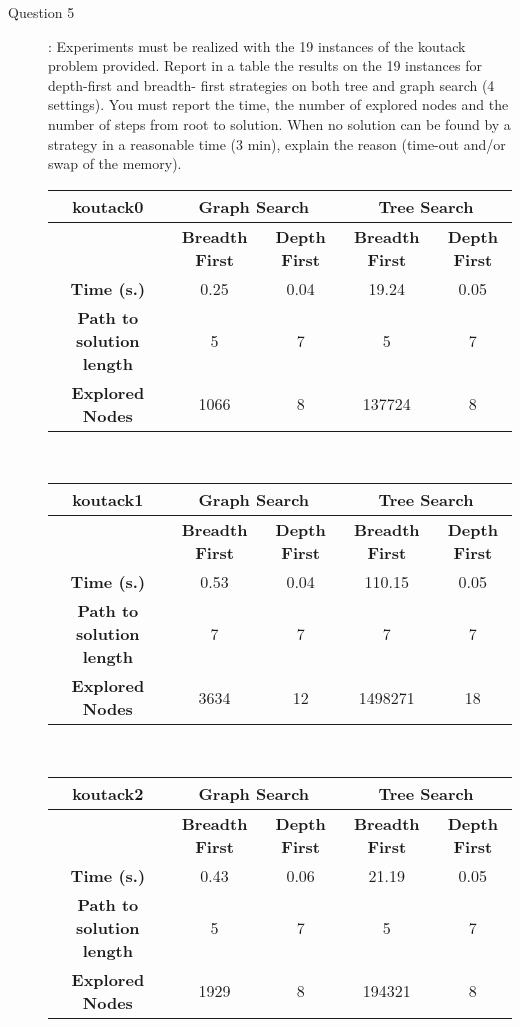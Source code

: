 \begin{description}
\item[Question 5]: Experiments must be realized with the 19 instances of the koutack problem provided. Report in a table the results on the 19 instances for depth-first and breadth- first strategies on both tree and graph search (4 settings). You must report the time, the number of explored nodes and the number of steps from root to solution. When no solution can be found by a strategy in a reasonable time (3 min), explain the reason (time-out and/or swap of the memory). \newline
\begin{tabular}{|c|c|c|c|c|} 
\hline \textbf{koutack0} & \multicolumn{2}{|c|}{\textbf{Graph Search}} & \multicolumn{2}{|c|}{\textbf{Tree Search}} \\ \hline & \textbf{Breadth First} &  \textbf{Depth First} & \textbf{Breadth First} &  \textbf{Depth First}\\ 
\hline \textbf{Time (s.)} & 0.25 & 0.04 & 19.24 & 0.05\\ \textbf{Path to solution length} & 5 & 7 & 5 & 7 \\ \textbf{Explored Nodes} & 1066 & 8 & 137724 & 8\\ 
\hline 
\end{tabular}\\
\begin{tabular}{|c|c|c|c|c|} 
\hline \textbf{koutack1} & \multicolumn{2}{|c|}{\textbf{Graph Search}} & \multicolumn{2}{|c|}{\textbf{Tree Search}} \\ \hline & \textbf{Breadth First} &  \textbf{Depth First} & \textbf{Breadth First} &  \textbf{Depth First}\\ 
\hline \textbf{Time (s.)} & 0.53 & 0.04 & 110.15 & 0.05\\ \textbf{Path to solution length} & 7 & 7 & 7 & 7 \\ \textbf{Explored Nodes} & 3634 & 12 & 1498271 & 18\\ 
\hline 
\end{tabular}\\
\begin{tabular}{|c|c|c|c|c|} 
\hline \textbf{koutack2} & \multicolumn{2}{|c|}{\textbf{Graph Search}} & \multicolumn{2}{|c|}{\textbf{Tree Search}} \\ \hline & \textbf{Breadth First} &  \textbf{Depth First} & \textbf{Breadth First} &  \textbf{Depth First}\\ 
\hline \textbf{Time (s.)} & 0.43 & 0.06 & 21.19 & 0.05\\ \textbf{Path to solution length} & 5 & 7 & 5 & 7 \\ \textbf{Explored Nodes} & 1929 & 8 & 194321 & 8\\ 

\end{tabular}
\end{description}
